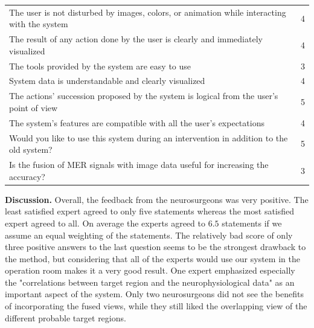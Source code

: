 \documentclass{vgtc}                          %
\begin{document}
\noindent \begin{tabular}{p{} c}
\hline
The user is not disturbed by images, colors, or animation while interacting with the system	& 4\\
The result of any action done by the user is clearly and immediately visualized				& 4\\
The tools provided by the system are easy to use												& 3\\
System data is understandable and clearly visualized											& 4\\
The actions' succession proposed by the system is logical from the user's point of view		& 5\\
The system's features are compatible with all the user's expectations							& 4\\
Would you like to use this system during an intervention in addition to the old system?		& 5\\
Is the fusion of MER signals with image data useful for increasing the accuracy?				& 3\\
\hline
\end{tabular}

\noindent \textbf{Discussion.} Overall, the feedback from the neurosurgeons was very positive. The least satisfied expert agreed to only five statements whereas the most satisfied expert agreed to all. On average the experts agreed to $6.5$ statements if we assume an equal weighting of the statements. The relatively bad score of only three positive answers to the last question seems to be the strongest drawback to the method, but considering that all of the experts would use our system in the operation room makes it a very good result. One expert emphasized especially the "correlations between target region and the neurophysiological data" as an important aspect of the system. Only two neurosurgeons did not see the benefits of incorporating the fused views, while they still liked the overlapping view of the different probable target regions.
\end{document}
